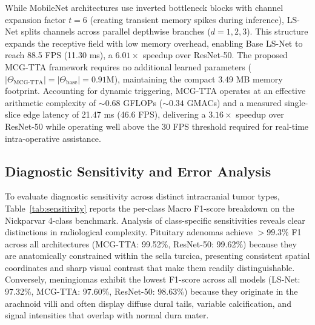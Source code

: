 While MobileNet architectures use inverted bottleneck blocks with channel expansion factor $t=6$ (creating transient memory spikes during inference), LS-Net splits channels across parallel depthwise branches ($d=1, 2, 3$). This structure expands the receptive field with low memory overhead, enabling Base LS-Net to reach 88.5 FPS (11.30 ms), a $6.01\times$ speedup over ResNet-50. The proposed MCG-TTA framework requires no additional learned parameters ($|\Theta_{\text{MCG-TTA}}| = |\Theta_{\text{base}}| = 0.91\text{M}$), maintaining the compact 3.49 MB memory footprint. Accounting for dynamic triggering, MCG-TTA operates at an effective arithmetic complexity of $\sim 0.68$ GFLOPs ($\sim 0.34$ GMACs) and a measured single-slice edge latency of 21.47 ms (46.6 FPS), delivering a $3.16\times$ speedup over ResNet-50 while operating well above the 30 FPS threshold required for real-time intra-operative assistance.

\subsection{Diagnostic Sensitivity and Error Analysis}

To evaluate diagnostic sensitivity across distinct intracranial tumor types, Table~\ref{tab:sensitivity} reports the per-class Macro F1-score breakdown on the Nickparvar 4-class benchmark. Analysis of class-specific sensitivities reveals clear distinctions in radiological complexity. Pituitary adenomas achieve $>99.3\%$ F1 across all architectures (MCG-TTA: 99.52\%, ResNet-50: 99.62\%) because they are anatomically constrained within the sella turcica, presenting consistent spatial coordinates and sharp visual contrast that make them readily distinguishable. Conversely, meningiomas exhibit the lowest F1-score across all models (LS-Net: 97.32\%, MCG-TTA: 97.60\%, ResNet-50: 98.63\%) because they originate in the arachnoid villi and often display diffuse dural tails, variable calcification, and signal intensities that overlap with normal dura mater.

